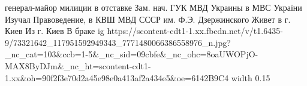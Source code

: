  
 
 
 
 

\par
генерал-майор милиции в отставке
Зам. нач. ГУК МВД Украины в МВС України
Изучал Правоведение, в КВШ МВД СССР им. Ф.Э. Дзержинского
Живет в г. Киев
Из г. Киев
В браке
\ifcmt
  ig https://scontent-cdt1-1.xx.fbcdn.net/v/t1.6435-9/73321642_117951592949343_7771480066386558976_n.jpg?_nc_cat=103&ccb=1-5&_nc_sid=09cbfe&_nc_ohc=8oaUWOPjO-MAX8ByDJm&_nc_ht=scontent-cdt1-1.xx&oh=90f2f3e70d2a45e98e0a413af2a434e5&oe=6142B9C4
  width 0.15
\fi

